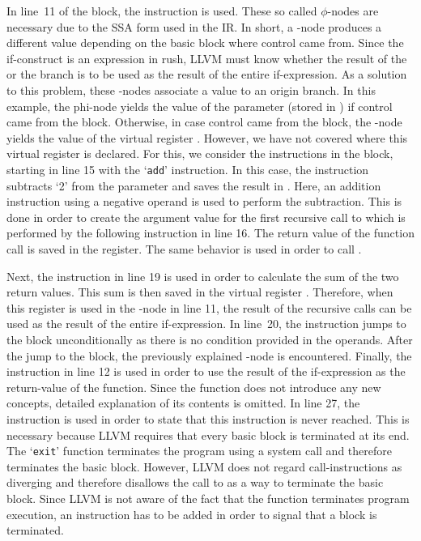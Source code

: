 In line~11 of the  block, the  instruction is used.
These so called $\phi$-nodes are necessary due to the SSA form used in the IR\@.
In short, a \phi-node produces a different value depending on the basic block where control came from.
Since the if-construct is an expression in rush, LLVM must know whether the result of the  or the  branch is to be used as the result of the entire if-expression.
As a solution to this problem, these \phi-nodes associate a value to an origin branch.
In this example, the phi-node yields the value of the parameter  (stored in ) if control came from the  block.
Otherwise, in case control came from the  block, the \phi-node yields the value of the virtual register .
However, we have not covered where this virtual register is declared.
For this, we consider the instructions in the  block, starting in line 15 with the `\texttt{add}' instruction.
In this case, the instruction subtracts `2' from the parameter  and saves the result in .
Here, an addition instruction using a negative operand is used to perform the subtraction.
This is done in order to create the argument value for the first recursive call to  which is performed by the following  instruction in line 16.
The return value of the function call is saved in the  register.
The same behavior is used in order to call .

Next, the  instruction in line 19 is used in order to calculate the sum of the two return values.
This sum is then saved in the virtual register .
Therefore, when this register is used in the \phi-node in line 11, the result of the recursive calls can be used as the result of the entire if-expression.
In line~20, the  instruction jumps to the  block unconditionally as there is no condition provided in the operands.
After the jump to the  block, the previously explained \phi-node is encountered.
Finally, the  instruction in line 12 is used in order to use the result of the if-expression as the return-value of the function.
Since the  function does not introduce any new concepts, detailed explanation of its contents is omitted.
In line 27, the  instruction is used in order to state that this instruction is never reached.
This is necessary because LLVM requires that every basic block is terminated at its end.
The `\texttt{exit}' function terminates the program using a system call and therefore terminates the basic block.
However, LLVM does not regard call-instructions as diverging and therefore disallows the call to  as a way to terminate the basic block.
Since LLVM is not aware of the fact that the  function terminates program execution,
an  instruction has to be added in order to signal that a block is terminated.

